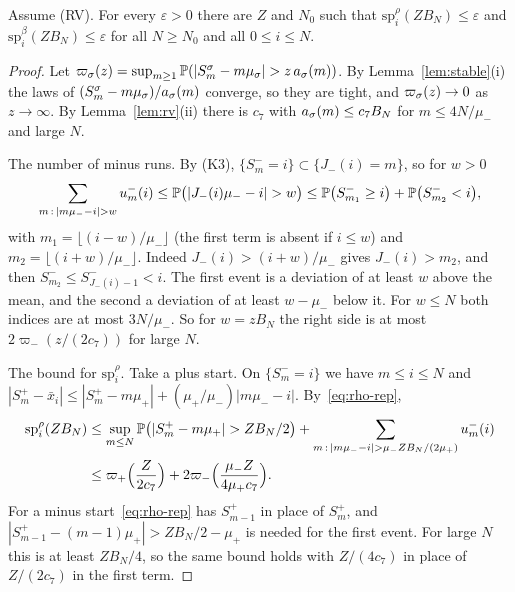 \begin{lemma}\label{lem:spread}
Assume (RV). For every $\varepsilon>0$ there are $Z$ and $N_0$ such that
$\mathrm{sp}^\rho_i(ZB_N)\le\varepsilon$ and $\mathrm{sp}^\beta_i(ZB_N)\le\varepsilon$ for
all $N\ge N_0$ and all $0\le i\le N$.
\end{lemma}

\begin{proof}
Let $\varpi_\sgn(z)=\sup_{m\ge1}\Prob(|S^\sgn_m-m\mu_\sgn|>z\,a_\sgn(m))$. By
Lemma~\ref{lem:stable}(i) the laws of $(S^\sigma_m-m\mu_\sigma)/a_\sigma(m)$ converge, so they are
tight, and $\varpi_\sigma(z)\to0$ as $z\to\infty$. By Lemma~\ref{lem:rv}(ii) there is $c_7$
with $a_\sigma(m)\le c_7B_N$ for $m\le4N/\mu_\minus$ and large $N$.

The number of minus runs. By (K3), $\{S^\minus_m=i\}\subset\{J_\minus(i)=m\}$, so for
$w>0$
\[
 \sum_{m\,:\,|m\mu_\minus-i|>w}u^\minus_m(i)\le\Prob\bigl(|J_\minus(i)\mu_\minus-i|>w\bigr)
 \le\Prob\bigl(S^\minus_{m_1}\ge i\bigr)+\Prob\bigl(S^\minus_{m_2}<i\bigr),
\]
with $m_1=\lfloor(i-w)/\mu_\minus\rfloor$ (the first term is absent if $i\le w$) and
$m_2=\lfloor(i+w)/\mu_\minus\rfloor$. Indeed $J_\minus(i)>(i+w)/\mu_\minus$ gives
$J_\minus(i)>m_2$, and then $S^\minus_{m_2}\le S^\minus_{J_\minus(i)-1}<i$. The first event is a deviation of at least $w$
above the mean, and the second a deviation of at least $w-\mu_\minus$ below it. For
$w\le N$ both indices are at most $3N/\mu_\minus$. So for $w=zB_N$ the right side is at
most $2\varpi_\minus(z/(2c_7))$ for large $N$.

The bound for $\mathrm{sp}^\rho_i$. Take a plus start. On $\{S^\minus_m=i\}$ we have $m\le i\le N$ and
$|S^\plus_m-\bar x_i|\le|S^\plus_m-m\mu_\plus|+(\mu_\plus/\mu_\minus)|m\mu_\minus-i|$.
By~\eqref{eq:rho-rep},
\begin{align*}
 \mathrm{sp}^\rho_i(ZB_N)&\le\sup_{m\le N}\Prob\bigl(|S^\plus_m-m\mu_\plus|>ZB_N/2\bigr)
 +\sum_{m\,:\,|m\mu_\minus-i|>\mu_\minus ZB_N/(2\mu_\plus)}u^\minus_m(i)\\
 &\le\varpi_\plus\Bigl(\frac Z{2c_7}\Bigr)+2\varpi_\minus\Bigl(\frac{\mu_\minus Z}{4\mu_\plus c_7}\Bigr).
\end{align*}
For a minus start~\eqref{eq:rho-rep} has $S^\plus_{m-1}$ in place of $S^\plus_m$, and
$|S^\plus_{m-1}-(m-1)\mu_\plus|>ZB_N/2-\mu_\plus$ is needed for the first event. For
large $N$ this is at least $ZB_N/4$, so the same bound holds with $Z/(4c_7)$ in place
of $Z/(2c_7)$ in the first term.


\end{proof}
